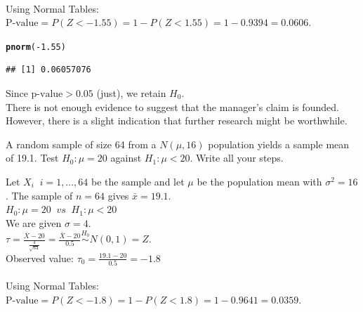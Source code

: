 \documentclass[bigtut]{tutorial}\usepackage[]{graphicx}\usepackage[]{color}
\makeatletter
\newcommand{\hlnum}[1]{\textcolor[rgb]{0.686,0.059,0.569}{#1}}%
\newcommand{\hlopt}[1]{\textcolor[rgb]{0,0,0}{#1}}%
\newcommand{\hlstd}[1]{\textcolor[rgb]{0.345,0.345,0.345}{#1}}%
\newcommand{\hlkwd}[1]{\textcolor[rgb]{0.737,0.353,0.396}{\textbf{#1}}}%
\newenvironment{kframe}{%
 \def\at@end@of@kframe{}%
 \ifinner\ifhmode%
  \def\at@end@of@kframe{\end{minipage}}%
  \begin{minipage}{\columnwidth}%
 \fi\fi%
 \def\FrameCommand##1{\hskip\@totalleftmargin \hskip-\fboxsep
 \colorbox{shadecolor}{##1}\hskip-\fboxsep
     \hskip-\linewidth \hskip-\@totalleftmargin \hskip\columnwidth}%
 \MakeFramed {\advance\hsize-\width
   \@totalleftmargin\z@ \linewidth\hsize
   \@setminipage}}%
 {\par\unskip\endMakeFramed%
 \at@end@of@kframe}
\newenvironment{knitrout}{}{} %
\makeatother
\begin{document}
\begin{tutorial}
\begin{questions}
\begin{solution}
 \\

Using Normal Tables: \\
$\text{P-value} = P( Z < -1.55) = 1-P(Z < 1.55) = 1-0.9394  = 0.0606$. \\

\begin{knitrout}
\color{fgcolor}\begin{kframe}
\begin{alltt}
\hlkwd{pnorm}\hlstd{(}\hlopt{-}\hlnum{1.55}\hlstd{)}
\end{alltt}
\begin{verbatim}
## [1] 0.06057076
\end{verbatim}
\end{kframe}
\end{knitrout}

\vspace{.5cm}
Since $\text{p-value} > 0.05$ (just), we retain $H_{0}$. \\
There is not enough evidence to suggest that the manager's claim is founded. However, there is a slight indication that further research might be worthwhile.
\end{solution}



\question 

A random sample of size 64 from a $N(\mu,16)$ population
yields a sample mean of 19.1. Test $H_0\colon\mu=20$ against
$H_1\colon\mu<20$. Write all your steps.


\begin{solution}
Let $X_{i} \;\; i=1,\ldots,64$ be the sample and let $\mu$ be the population mean with $\sigma^2=16$. The sample of $n=64$ gives $\bar{x}=19.1$.\\

$H_0: \mu=20  \;\; vs \;\; H_1: \mu < 20$ \\

We are given $\sigma = 4$. \\

$\tau = \frac{ \bar{X} - 20}{\frac{4}{\sqrt{64}}} = \frac{ \bar{X} - 20}{0.5} \overset{H_0}{\sim} N(0,1) = Z$. \\
Observed value: $\tau_{0} = \frac{19.1-20}{0.5} = -1.8$ \\

 \\

Using Normal Tables: \\
$\text{P-value} = P( Z < -1.8) = 1-P(Z < 1.8) = 1-0.9641  = 0.0359$. \\


\end{solution}
\end{questions}
\end{tutorial}
\end{document}
